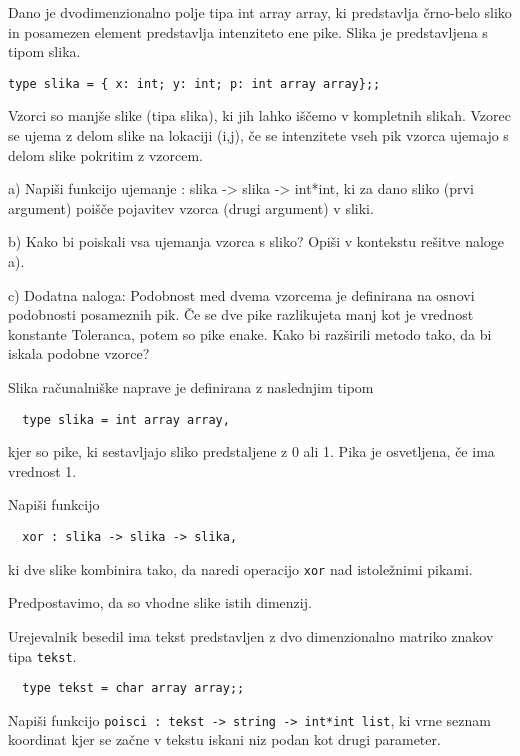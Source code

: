 \begin{ex}
Dano je dvodimenzionalno polje tipa int array array, ki predstavlja \v crno-belo sliko in posamezen element predstavlja intenziteto ene pike. Slika je predstavljena s tipom slika.
\begin{lstlisting}
type slika = { x: int; y: int; p: int array array};;
\end{lstlisting}
Vzorci so manj\v se slike (tipa slika), ki jih lahko i\v s\v cemo v kompletnih slikah. Vzorec se ujema z delom slike na lokaciji (i,j), \v ce se intenzitete vseh pik vzorca ujemajo s delom slike pokritim z vzorcem.

a) Napi\v si funkcijo ujemanje : slika -> slika -> int*int, ki za dano sliko (prvi argument) poi\v s\v ce pojavitev vzorca (drugi argument) v sliki.

b) Kako bi poiskali vsa ujemanja vzorca s sliko? Opi\v si v kontekstu re\v sitve naloge a).

c) Dodatna naloga: Podobnost med dvema vzorcema je definirana na osnovi podobnosti posameznih pik. \v Ce se dve pike razlikujeta manj kot je vrednost konstante Toleranca, potem so pike enake. Kako bi raz\v sirili metodo tako, da bi iskala podobne vzorce?
\end{ex}




\begin{ex}
  Slika ra\v cunalni\v ske naprave je definirana z naslednjim tipom

\begin{lstlisting}
  type slika = int array array,
\end{lstlisting}

  kjer so pike, ki sestavljajo sliko predstaljene z 0 ali 1. Pika je
  osvetljena, \v ce ima vrednost 1.

  Napi\v si funkcijo

\begin{lstlisting}
  xor : slika -> slika -> slika,
\end{lstlisting}

  ki dve slike kombinira tako, da naredi operacijo \lstinline{xor} nad
  istole\v znimi pikami.

  Predpostavimo, da so vhodne slike istih dimenzij.
\end{ex} 




\begin{ex}
  Urejevalnik besedil ima tekst predstavljen z dvo dimenzionalno
  matriko znakov tipa \lstinline{tekst}.

\begin{lstlisting}
  type tekst = char array array;;
\end{lstlisting}
  Napi\v si funkcijo 
  \lstinline{poisci : tekst -> string -> int*int list}, 
  ki vrne seznam koordinat kjer se 
  za\v cne v tekstu iskani niz
  podan kot drugi parameter. 
\end{ex} 





